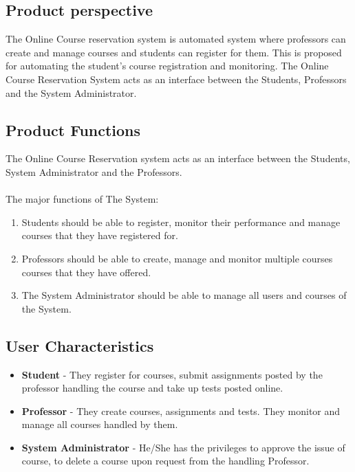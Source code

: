 \documentclass[12pt, a4]{article}
\begin{document}
\subsection{Product perspective}
The Online Course reservation system is automated system where professors can create and manage courses and students can register for them. This is proposed for automating the student’s course registration and monitoring. The Online Course Reservation System acts as an interface between the Students, Professors and the System Administrator.


\subsection{Product Functions}
The Online Course Reservation system acts as an interface between the Students, System Administrator and the Professors.
\\\\
The major functions of The System:
\begin{enumerate}
    \item Students should be able to register, monitor their performance and manage courses that they have registered for.
    \item Professors should be able to create, manage and monitor multiple courses courses that they have offered.
    \item The System Administrator should be able to manage all users and courses of the System.
\end{enumerate}


\subsection{User Characteristics}
\begin{itemize}
    \item \textbf{Student} - They register for courses, submit assignments posted by the professor handling the course and take up tests posted online.
    \item \textbf{Professor} - They create courses, assignments and tests. They monitor and manage all courses handled by them.
    \item \textbf{System Administrator} - He/She has the privileges to approve the issue of course, to delete a course upon request from the handling Professor.
\end{itemize}
\end{document}
